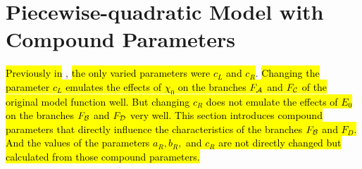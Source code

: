 \section{Piecewise-quadratic Model with Compound Parameters}
\label{sec:setup.quad.hyper}

\hl{Previously in} , \hl{the only varied parameters were $c_L$ and $c_R$}.
\hl{
	Changing the parameter $c_L$ emulates the effects of $\chi_0$ on the branches $F_{\mathcal{A}}$ and $F_{\mathcal{C}}$ of the original model function well.
	But changing $c_R$ does not emulate the effects of $E_0$ on the branches $F_{\mathcal{B}}$ and $F_{\mathcal{D}}$ very well.
	This section introduces compound parameters that directly influence the characteristics of the branches $F_{\mathcal{B}}$ and $F_D$.
	And the values of the parameters $a_R, b_R,$ and $c_R$ are not directly changed but calculated from those compound parameters.
}




